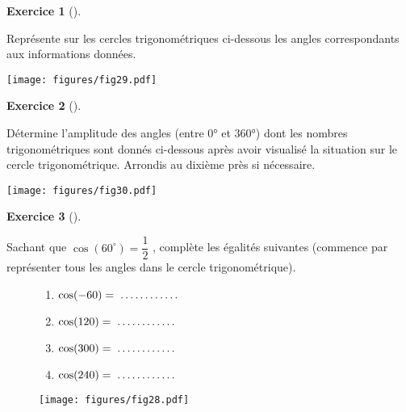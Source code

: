 \documentclass[
  a4paper,
  DIV=11,
  numbers=noendperiod,
  oneside]{scrreprt}
\theoremstyle{definition}
\theoremstyle{definition}
\newtheorem{exercise}{Exercice}[chapter]
\theoremstyle{plain}
\theoremstyle{definition}
\theoremstyle{remark}
\begin{document}
\newpage{}

\begin{exercise}[]\protect\hypertarget{exr-}{}\label{exr-}

Représente sur les cercles trigonométriques ci-dessous les angles
correspondants aux informations données.

\begin{center}
\texttt{[image: figures/fig29.pdf]}
\end{center}

\end{exercise}

\newpage{}

\begin{exercise}[]\protect\hypertarget{exr-}{}\label{exr-}

Détermine l'amplitude des angles (entre 0° et 360°) dont les nombres
trigonométriques sont donnés ci-dessous après avoir visualisé la
situation sur le cercle trigonométrique. Arrondis au dixième près si
nécessaire.

\begin{center}
\texttt{[image: figures/fig30.pdf]}
\end{center}

\end{exercise}

\newpage{}

\begin{exercise}[]\protect\hypertarget{exr-}{}\label{exr-}

Sachant que \(\cos(60^\circ) = \dfrac{1}{2}\) , complète les égalités
suivantes (commence par représenter tous les angles dans le cercle
trigonométrique).

\begin{figure}

\begin{minipage}{0.60\linewidth}

\begin{enumerate}
\def\labelenumi{\arabic{enumi})}
\item
  \(\cos(-60)=\makebox[2cm]{\dotfill}\)
\item
  \(\cos(120)=\makebox[2cm]{\dotfill}\)
\item
  \(\cos(300)=\makebox[2cm]{\dotfill}\)
\item
  \(\cos(240)=\makebox[2cm]{\dotfill}\)
\end{enumerate}

\end{minipage}%
%
\begin{minipage}{0.40\linewidth}
\begin{center}
\texttt{[image: figures/fig28.pdf]}
\end{center}
\end{minipage}%

\end{figure}%

\end{exercise}
\end{document}
